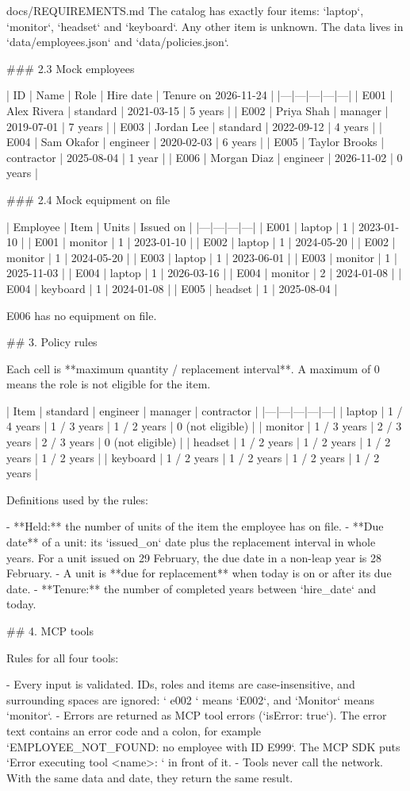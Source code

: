 \documentclass[11pt,letterpaper]{article}
\renewcommand{\_}{\textunderscore\allowbreak}
\begin{document}
\begin{appendixpromptbox}{docs/REQUIREMENTS.md}
The catalog has exactly four items: `laptop`, `monitor`, `headset` and `keyboard`. Any other item
is unknown. The data lives in `data/employees.json` and `data/policies.json`.

### 2.3 Mock employees

| ID | Name | Role | Hire date | Tenure on 2026-11-24 |
|---|---|---|---|---|
| E001 | Alex Rivera | standard | 2021-03-15 | 5 years |
| E002 | Priya Shah | manager | 2019-07-01 | 7 years |
| E003 | Jordan Lee | standard | 2022-09-12 | 4 years |
| E004 | Sam Okafor | engineer | 2020-02-03 | 6 years |
| E005 | Taylor Brooks | contractor | 2025-08-04 | 1 year |
| E006 | Morgan Diaz | engineer | 2026-11-02 | 0 years |

### 2.4 Mock equipment on file

| Employee | Item | Units | Issued on |
|---|---|---|---|
| E001 | laptop | 1 | 2023-01-10 |
| E001 | monitor | 1 | 2023-01-10 |
| E002 | laptop | 1 | 2024-05-20 |
| E002 | monitor | 1 | 2024-05-20 |
| E003 | laptop | 1 | 2023-06-01 |
| E003 | monitor | 1 | 2025-11-03 |
| E004 | laptop | 1 | 2026-03-16 |
| E004 | monitor | 2 | 2024-01-08 |
| E004 | keyboard | 1 | 2024-01-08 |
| E005 | headset | 1 | 2025-08-04 |

E006 has no equipment on file.

## 3. Policy rules

Each cell is **maximum quantity / replacement interval**. A maximum of 0 means the role is not
eligible for the item.

| Item | standard | engineer | manager | contractor |
|---|---|---|---|---|
| laptop | 1 / 4 years | 1 / 3 years | 1 / 2 years | 0 (not eligible) |
| monitor | 1 / 3 years | 2 / 3 years | 2 / 3 years | 0 (not eligible) |
| headset | 1 / 2 years | 1 / 2 years | 1 / 2 years | 1 / 2 years |
| keyboard | 1 / 2 years | 1 / 2 years | 1 / 2 years | 1 / 2 years |

Definitions used by the rules:

- **Held:** the number of units of the item the employee has on file.
- **Due date** of a unit: its `issued_on` date plus the replacement interval in whole years. For
  a unit issued on 29 February, the due date in a non-leap year is 28 February.
- A unit is **due for replacement** when today is on or after its due date.
- **Tenure:** the number of completed years between `hire_date` and today.

## 4. MCP tools

Rules for all four tools:

- Every input is validated. IDs, roles and items are case-insensitive, and surrounding spaces are
  ignored: ` e002 ` means `E002`, and `Monitor` means `monitor`.
- Errors are returned as MCP tool errors (`isError: true`). The error text contains an error
  code and a colon, for example `EMPLOYEE_NOT_FOUND: no employee with ID E999`. The MCP SDK
  puts `Error executing tool <name>: ` in front of it.
- Tools never call the network. With the same data and date, they return the same result.


\end{appendixpromptbox}
\end{document}
